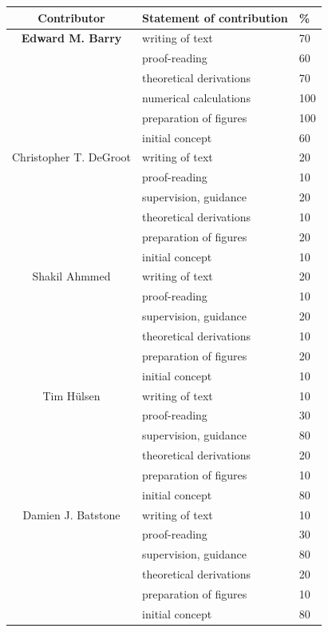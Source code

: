 \cleartoevenpage
\pagestyle{empty}	%


\begin{table}[h]
	\begin{center}
	\begin{tabular}{|c|l|l|}
		\hline
		Contributor & Statement of contribution & \% \\
		\hline
		\textbf{Edward M. Barry}	    & writing of text 			& 70\\
										& proof-reading				& 60 \\
										& theoretical derivations 	& 70 \\
										& numerical calculations 	& 100\\
										& preparation of figures 	& 100 \\
										& initial concept			& 60 \\
		\hline
		Christopher T. DeGroot			& writing of text 			& 20\\
										& proof-reading				& 10 \\
										& supervision, guidance 	& 20\\
										& theoretical derivations 	& 10\\
										& preparation of figures 	& 20 \\
										& initial concept			& 10 \\
		\hline
		Shakil Ahmmed       			& writing of text 			& 20\\
										& proof-reading				& 10 \\
										& supervision, guidance 	& 20\\
										& theoretical derivations 	& 10\\
										& preparation of figures 	& 20 \\
										& initial concept			& 10 \\
		\hline
		Tim H\"{u}lsen		    		& writing of text 			& 10\\
										& proof-reading				& 30 \\
										& supervision, guidance 	& 80 \\
										& theoretical derivations 	& 20 \\
										& preparation of figures 	& 10 \\
										& initial concept			& 80 \\
		\hline
		Damien J. Batstone	    		& writing of text 			& 10\\
										& proof-reading				& 30 \\
										& supervision, guidance 	& 80 \\
										& theoretical derivations 	& 20 \\
										& preparation of figures 	& 10 \\
										& initial concept			& 80 \\
		\hline
	\end{tabular}
	\end{center}
\end{table}


